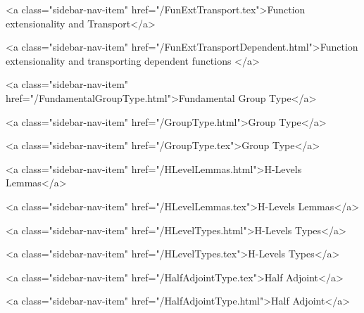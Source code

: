       
    
      
        
          <a class="sidebar-nav-item" href="/FunExtTransport.tex">Function extensionality and Transport</a>
        
      
    
      
        
          <a class="sidebar-nav-item" href="/FunExtTransportDependent.html">Function extensionality and transporting dependent functions </a>
        
      
    
      
        
          <a class="sidebar-nav-item" href="/FundamentalGroupType.html">Fundamental Group Type</a>
        
      
    
      
        
          <a class="sidebar-nav-item" href="/GroupType.html">Group Type</a>
        
      
    
      
        
          <a class="sidebar-nav-item" href="/GroupType.tex">Group Type</a>
        
      
    
      
        
          <a class="sidebar-nav-item" href="/HLevelLemmas.html">H-Levels Lemmas</a>
        
      
    
      
        
          <a class="sidebar-nav-item" href="/HLevelLemmas.tex">H-Levels Lemmas</a>
        
      
    
      
        
          <a class="sidebar-nav-item" href="/HLevelTypes.html">H-Levels Types</a>
        
      
    
      
        
          <a class="sidebar-nav-item" href="/HLevelTypes.tex">H-Levels Types</a>
        
      
    
      
        
          <a class="sidebar-nav-item" href="/HalfAdjointType.tex">Half Adjoint</a>
        
      
    
      
        
          <a class="sidebar-nav-item" href="/HalfAdjointType.html">Half Adjoint</a>
        
